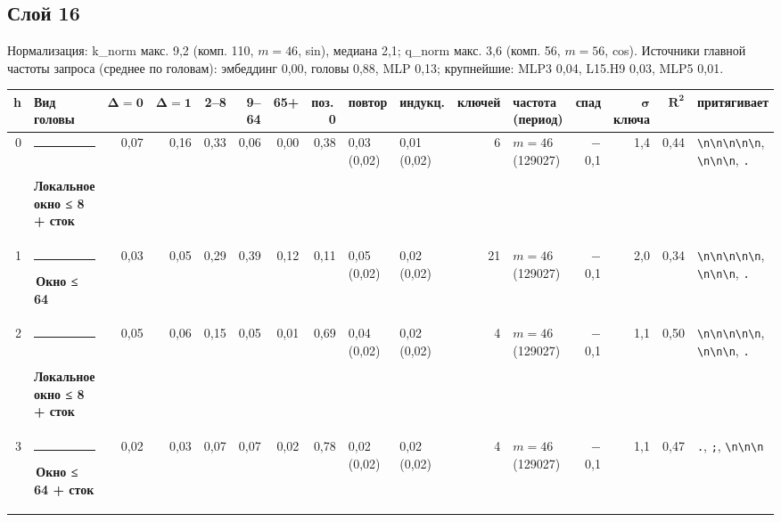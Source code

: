 \documentclass[10pt]{article}
\begin{document}
\noindent\begin{minipage}{\linewidth}
\subsection*{Слой 16}
{\small\color{ink2} Нормализация: k\_norm макс. 9,2 (комп. 110, $m{=}46$, sin), медиана 2,1; q\_norm макс. 3,6 (комп. 56, $m{=}56$, cos). Источники главной частоты запроса (среднее по головам): эмбеддинг 0,00, головы 0,88, MLP 0,13; крупнейшие: MLP3 0,04, L15.H9 0,03, MLP5 0,01.}
\begin{center}{\footnotesize\begin{tabular}{|r|l|r|r|r|r|r|r|l|l|r|l|r|r|r|l|}
\hline
\rowcolor{head}\textbf{h} & \textbf{Вид головы} & $\boldsymbol{\Delta{=}0}$ & $\boldsymbol{\Delta{=}1}$ & \textbf{2–8} & \textbf{9–64} & \textbf{65+} & \textbf{поз.\,0} & \textbf{повтор} & \textbf{индукц.} & \textbf{ключей} & \textbf{частота (период)} & \textbf{спад} & $\boldsymbol{\sigma}$ \textbf{ключа} & $\boldsymbol{R^2}$ & \textbf{притягивает} \\ \hline
0 & \textcolor[HTML]{1BAF7A}{\rule{0.62em}{0.62em}}\,\textbf{Локальное окно ≤ 8 + сток} & 0,07 & 0,16 & 0,33 & 0,06 & 0,00 & 0,38 & 0,03 (0,02) & 0,01 (0,02) & 6 & $m{=}46$ (129027) & $-$0,1 & 1,4 & 0,44 & \texttt{\textvisiblespace{}\textbackslash{}n\textbackslash{}n\textbackslash{}n\textbackslash{}n\textbackslash{}n}, \texttt{\textvisiblespace{}\textbackslash{}n\textbackslash{}n\textbackslash{}n}, \texttt{\textvisiblespace{}.} \\ \hline
1 & \textcolor[HTML]{EDA100}{\rule{0.62em}{0.62em}}\,\textbf{Окно ≤ 64} & 0,03 & 0,05 & 0,29 & 0,39 & 0,12 & 0,11 & 0,05 (0,02) & 0,02 (0,02) & 21 & $m{=}46$ (129027) & $-$0,1 & 2,0 & 0,34 & \texttt{\textvisiblespace{}\textbackslash{}n\textbackslash{}n\textbackslash{}n\textbackslash{}n\textbackslash{}n}, \texttt{\textvisiblespace{}\textbackslash{}n\textbackslash{}n\textbackslash{}n}, \texttt{\textvisiblespace{}.} \\ \hline
2 & \textcolor[HTML]{1BAF7A}{\rule{0.62em}{0.62em}}\,\textbf{Локальное окно ≤ 8 + сток} & 0,05 & 0,06 & 0,15 & 0,05 & 0,01 & 0,69 & 0,04 (0,02) & 0,02 (0,02) & 4 & $m{=}46$ (129027) & $-$0,1 & 1,1 & 0,50 & \texttt{\textvisiblespace{}\textbackslash{}n\textbackslash{}n\textbackslash{}n\textbackslash{}n\textbackslash{}n}, \texttt{\textvisiblespace{}\textbackslash{}n\textbackslash{}n\textbackslash{}n}, \texttt{\textvisiblespace{}.} \\ \hline
3 & \textcolor[HTML]{EDA100}{\rule{0.62em}{0.62em}}\,\textbf{Окно ≤ 64 + сток} & 0,02 & 0,03 & 0,07 & 0,07 & 0,02 & 0,78 & 0,02 (0,02) & 0,02 (0,02) & 4 & $m{=}46$ (129027) & $-$0,1 & 1,1 & 0,47 & \texttt{\textvisiblespace{}.}, \texttt{\textvisiblespace{};}, \texttt{\textvisiblespace{}\textbackslash{}n\textbackslash{}n\textbackslash{}n} \\ \hline

\end{tabular}}
\end{center}
\end{minipage}
\end{document}
